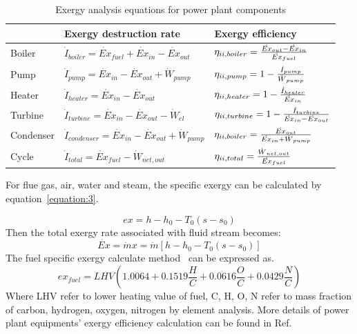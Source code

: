 \documentclass[preprint,12pt]{elsarticle}
\begin{document}
\begin{table}
\caption{Exergy analysis equations for power plant components}
\label{tab:exergy equation}
\centering
\begin{tabular}{lll}
\toprule 
 & Exergy destruction rate  & Exergy efficiency\tabularnewline
\midrule
Boiler & $\dot{I}_{boiler}=\dot{Ex}{}_{fuel}+\dot{Ex}{}_{in}-\dot{Ex}{}_{out}$ & $\eta_{\uppercase\expandafter{\romannumeral2},boiler}=\frac{\dot{Ex}{}_{out}-\dot{Ex}{}_{in}}{\dot{Ex}{}_{fuel}}$\tabularnewline
Pump & $\dot{I}_{pump}=\dot{Ex}{}_{in}-\dot{Ex}{}_{out}+\dot{W}{}_{pump}$ & $\eta_{\uppercase\expandafter{\romannumeral2},pump}=1-\frac{\dot{I}_{pump}}{\dot{W}{}_{pump}}$\tabularnewline
Heater & $\dot{I}_{heater}=\dot{Ex}{}_{in}-\dot{Ex}{}_{out}$ & $\eta_{\uppercase\expandafter{\romannumeral2},heater}=1-\frac{\dot{I}_{heater}}{\dot{Ex}{}_{in}}$\tabularnewline
Turbine & $\dot{I}_{turbine}=\dot{Ex}{}_{in}-\dot{Ex}{}_{out}-\dot{W}{}_{el}$ & $\eta_{\uppercase\expandafter{\romannumeral2},turbine}=1-\frac{\dot{I}_{turbine}}{\dot{Ex}{}_{in}-\dot{Ex}{}_{out}}$\tabularnewline
Condenser & $\dot{I}_{condenser}=\dot{Ex}{}_{in}-\dot{Ex}{}_{out}+\dot{W}{}_{pump}$ & $\eta_{\uppercase\expandafter{\romannumeral2},boiler}=\frac{\dot{Ex}{}_{out}}{\dot{Ex}{}_{in}+\dot{W}{}_{pump}}$\tabularnewline
Cycle &$\dot{I}_{total}=\dot{Ex}{}_{fuel}-\dot{W}{}_{net,out}$ & $\eta_{\uppercase\expandafter{\romannumeral2},total}=\frac{\dot{W}{}_{net,out}}{\dot{Ex}{}_{fuel}}$\tabularnewline
\bottomrule
\end{tabular}
\end{table}

For flue gas, air, water and steam, the specific exergy can be calculated by equation~\ref{equation:3}.

\begin{equation}{}
\label{equation:3}
ex=h-h_{0}-T_{0}\left(s-s_{0}\right)
\end{equation}
Then the total exergy rate associated with ﬂuid stream becomes:
\begin{equation}
\dot{Ex}=\dot{m}x=\dot{m}\left[h-h_{0}-T_{0}\left(s-s_{0}\right)\right]{}
\end{equation}
The fuel specific exergy calculate method~\cite{Yan2016The} can be expressed as.
\begin{equation}
ex_{fuel}=LHV\left(1.0064+0.1519\frac{H}{C}+0.0616\frac{O}{C}+0.0429\frac{N}{C}\right)
\end{equation}
Where LHV refer to lower heating value of fuel, C, H, O, N refer to mass fraction of carbon, hydrogen, oxygen, nitrogen by element analysis.
More details of power plant equipments' exergy  efficiency calculation can be found in Ref.~\cite{G2016Exergy}
\end{document}
